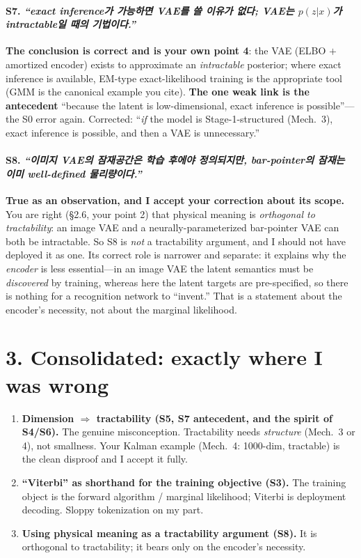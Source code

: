 \documentclass[11pt]{article}
\newcommand{\korean}[1]{\textit{#1}}
\begin{document}
\paragraph{S7. \korean{``exact inference가 가능하면 VAE를 쓸 이유가 없다; VAE는 $p(z|x)$가
intractable일 때의 기법이다.''}}
\textbf{The conclusion is correct and is your own point 4}: the VAE (ELBO $+$ amortized encoder)
exists to approximate an \emph{intractable} posterior; where exact inference is available, EM-type
exact-likelihood training is the appropriate tool (GMM is the canonical example you cite). \textbf{The
one weak link is the antecedent} ``because the latent is low-dimensional, exact inference is
possible''---the S0 error again. Corrected: ``\emph{if} the model is Stage-1-structured (Mech.~3),
exact inference is possible, and then a VAE is unnecessary.''

\paragraph{S8. \korean{``이미지 VAE의 잠재공간은 학습 후에야 정의되지만, bar-pointer의 잠재는
이미 well-defined 물리량이다.''}}
\textbf{True as an observation, and I accept your correction about its scope.} You are right (\S2.6,
your point 2) that physical meaning is \emph{orthogonal to tractability}: an image VAE and a
neurally-parameterized bar-pointer VAE can both be intractable. So S8 is \emph{not} a tractability
argument, and I should not have deployed it as one. Its correct role is narrower and separate: it
explains why the \emph{encoder} is less essential---in an image VAE the latent semantics must be
\emph{discovered} by training, whereas here the latent targets are pre-specified, so there is nothing
for a recognition network to ``invent.'' That is a statement about the encoder's necessity, not
about the marginal likelihood.

\section*{3. Consolidated: exactly where I was wrong}

\begin{enumerate}[leftmargin=1.6em]
\item \textbf{Dimension $\Rightarrow$ tractability (S5, S7 antecedent, and the spirit of S4/S6).}
The genuine misconception. Tractability needs \emph{structure} (Mech.~3 or 4), not smallness. Your
Kalman example (Mech.~4: 1000-dim, tractable) is the clean disproof and I accept it fully.
\item \textbf{``Viterbi'' as shorthand for the training objective (S3).} The training object is the
forward algorithm / marginal likelihood; Viterbi is deployment decoding. Sloppy tokenization on my
part.
\item \textbf{Using physical meaning as a tractability argument (S8).} It is orthogonal to
tractability; it bears only on the encoder's necessity.
\end{enumerate}
\end{document}
